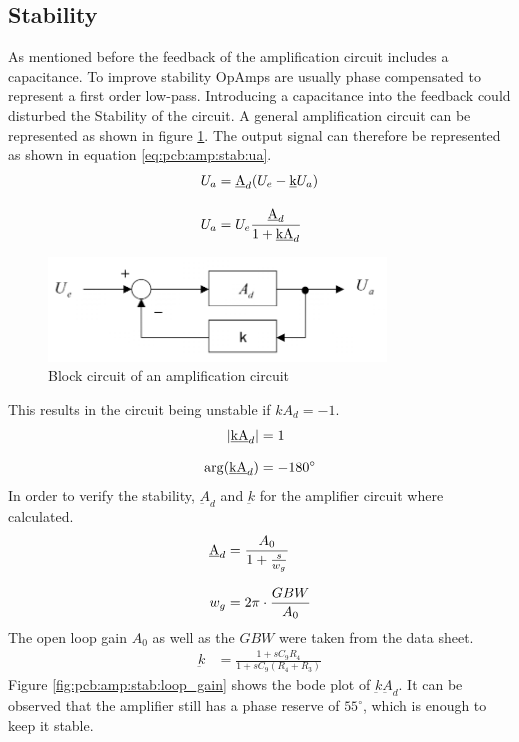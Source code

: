 \subsection{Stability}

As mentioned before the feedback of the amplification circuit includes a capacitance. To improve stability OpAmps are usually phase compensated to represent a first order low-pass. Introducing a capacitance into the feedback could disturbed the Stability of the circuit.\cite{okorn_analoge_2021}\p
A general amplification circuit can be represented as shown in figure \ref{fig:pcb:amp:stab:block}. The output signal can therefore be represented as shown in equation \ref{eq:pcb:amp:stab:ua}.
%
\begin{align}
  U_a &= \underbar{A}_d (U_e - \underbar{k}U_a)\pmath
  U_a &= U_e \cfrac{\underbar{A}_d}{1 + \underbar{k}\underbar{A}_d}\label{eq:pcb:amp:stab:ua}
\end{align}
%
\begin{figure}
  \centering
  \includegraphics[width=0.8\textwidth]{src/assets/pictures/circuit/amp_block_circuit.png}
  \caption{Block circuit of an amplification circuit\cite{okorn_analoge_2021}}\label{fig:pcb:amp:stab:block}
\end{figure}
%
This results in the circuit being unstable if $kA_d = -1$.
%
\begin{align}
  |\underbar{k}\underbar{A}_d| &= 1\pmath
  \arg(\underbar{k}\underbar{A}_d) &= - 180^\circ
\end{align}
%
In order to verify the stability, $\underbar{A}_d$ and $\underbar{k}$ for the amplifier circuit where calculated.
%
\begin{align}
  \underbar{A}_d &= \frac{A_0}{1 + \frac{s}{w_g}}\pmath
  w_g &= 2\pi \cdot \frac{GBW}{A_0}
\end{align}
%
The open loop gain $A_0$ as well as the $GBW$ were taken from the data sheet.\cite{texas_instruments_tl08xx_2021}
%
\begin{align}
  \underbar{k} &= \frac{1 + s C_9 R_4}{1 + s C_9 (R_4 + R_3)}
\end{align}
%
Figure \ref{fig:pcb:amp:stab:loop_gain} shows the bode plot of $\underbar{k}\underbar{A}_d$. It can be observed that the amplifier still has a phase reserve of $55^\circ$, which is enough to keep it stable.
